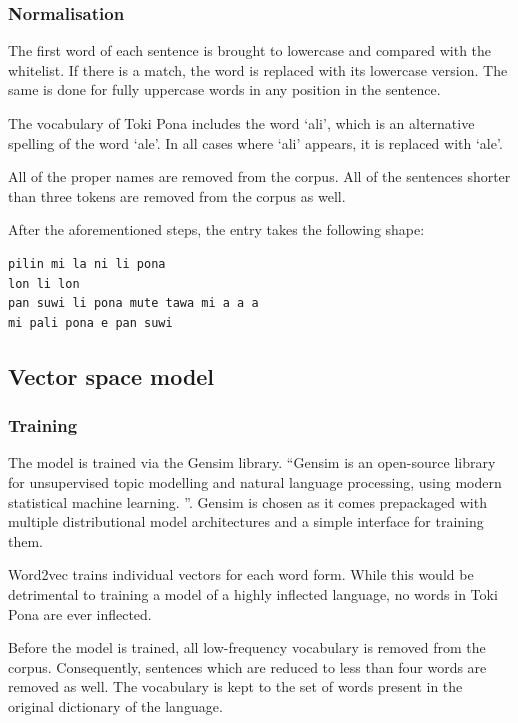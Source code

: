 \documentclass[14pt, a4paper]{extreport}
\begin{document}
      \subsubsection{Normalisation}
The first word of each sentence is brought to lowercase and compared with the whitelist. If there is a match, the word is replaced with its lowercase version. The same is done for fully uppercase words in any position in the sentence.

The vocabulary of Toki Pona includes the word `ali', which is an alternative spelling of the word `ale'. In all cases where `ali' appears, it is replaced with `ale'.

All of the proper names are removed from the corpus. All of the sentences shorter than three tokens are removed from the corpus as well.

After the aforementioned steps, the entry takes the following shape:

\begin{lstlisting}
pilin mi la ni li pona
lon li lon
pan suwi li pona mute tawa mi a a a
mi pali pona e pan suwi
\end{lstlisting}

    \subsection{Vector space model}
      \subsubsection{Training}
The model is trained via the Gensim library. ``Gensim is an open-source library for unsupervised topic modelling and natural language processing, using modern statistical machine learning. \parencite{gensim}''. Gensim is chosen as it comes prepackaged with multiple distributional model architectures and a simple interface for training them.

Word2vec trains individual vectors for each word form. While this would be detrimental to training a model of a highly inflected language, no words in Toki Pona are ever inflected.

Before the model is trained, all low-frequency vocabulary is removed from the corpus. Consequently, sentences which are reduced to less than four words are removed as well. The vocabulary is kept to the set of words present in the original dictionary of the language.
\end{document}
